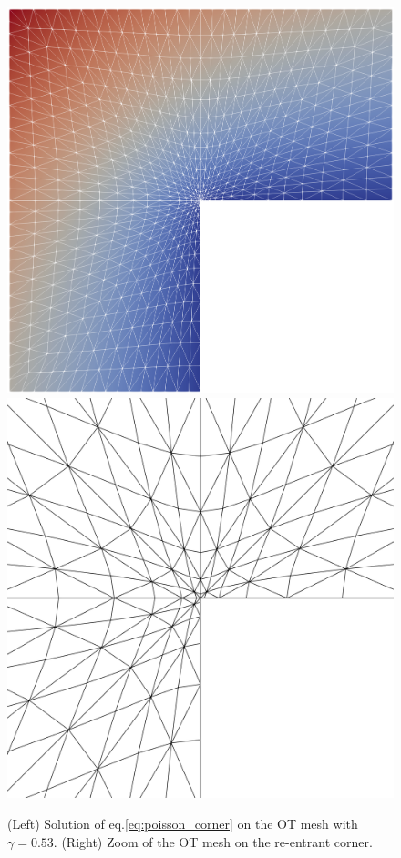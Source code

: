 \documentclass[a4paper,11pt]{article}
\begin{document}
{\begin{figure}[h!]
    \centering
    \includegraphics[width=0.3\linewidth]{Images/Test1/OT/u_OT.png}
    \includegraphics[width=0.287\linewidth]{Images/Test1/OT/OT_zoom_Lshaped.png}
\caption{(Left) Solution of eq.\eqref{eq:poisson_corner} on the OT mesh with $\gamma = 0.53$. (Right) Zoom of the OT mesh on the re-entrant corner.}  
\label{fig:OT_mesh}
\end{figure}


}
\end{document}
